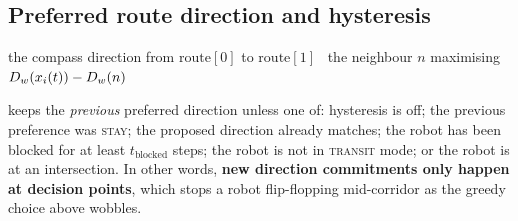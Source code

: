 \subsection{Preferred route direction and hysteresis}
\label{sec:score-hysteresis}

\begin{algorithm}[H]
\caption{}
\begin{algorithmic}[1]
  \Return the compass direction from $\mathrm{route}[0]$ to $\mathrm{route}[1]$
\Else
  \ \Return the neighbour $n$ maximising $D_{w}(x_{i}(t)) - D_{w}(n)$
\EndIf
\end{algorithmic}
\end{algorithm}

 keeps the \emph{previous} preferred
direction unless one of: hysteresis is off; the previous preference was
\textsc{stay}; the proposed direction already matches; the robot has been
blocked for at least $t_{\mathrm{blocked}}$ steps; the robot is not in
\textsc{transit} mode; or the robot is at an intersection. In other words,
\textbf{new direction commitments only happen at decision points}, which stops
a robot flip-flopping mid-corridor as the greedy choice above wobbles.
